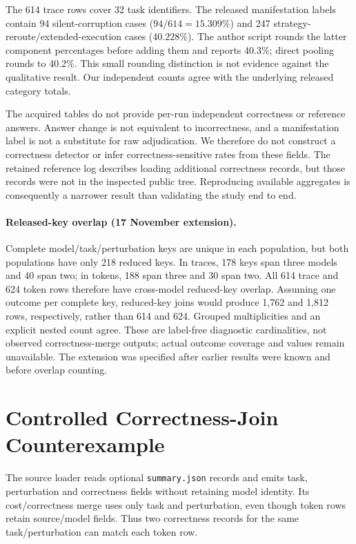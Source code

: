 \documentclass[sigconf,nonacm]{acmart}
\begin{document}
The 614 trace rows cover 32 task identifiers. The released manifestation labels contain 94 silent-corruption cases ($94/614=15.309\%$) and 247 strategy-reroute/extended-execution cases ($40.228\%$). The author script rounds the latter component percentages before adding them and reports 40.3\%; direct pooling rounds to 40.2\%. This small rounding distinction is not evidence against the qualitative result. Our independent counts agree with the underlying released category totals.

The acquired tables do not provide per-run independent correctness or reference answers. Answer change is not equivalent to incorrectness, and a manifestation label is not a substitute for raw adjudication. We therefore do not construct a correctness detector or infer correctness-sensitive rates from these fields. The retained reference log describes loading additional correctness records, but those records were not in the inspected public tree. Reproducing available aggregates is consequently a narrower result than validating the study end to end.

\paragraph{Released-key overlap (17 November extension).}
Complete model/task/perturbation keys are unique in each population, but both populations have only 218 reduced keys. In traces, 178 keys span three models and 40 span two; in tokens, 188 span three and 30 span two. All 614 trace and 624 token rows therefore have cross-model reduced-key overlap. Assuming one outcome per complete key, reduced-key joins would produce 1,762 and 1,812 rows, respectively, rather than 614 and 624. Grouped multiplicities and an explicit nested count agree. These are label-free diagnostic cardinalities, not observed correctness-merge outputs; actual outcome coverage and values remain unavailable. The extension was specified after earlier results were known and before overlap counting.

\section{Controlled Correctness-Join Counterexample}
The source loader reads optional \texttt{summary.json} records and emits task, perturbation and correctness fields without retaining model identity. Its cost/correctness merge uses only task and perturbation, even though token rows retain source/model fields. Thus two correctness records for the same task/perturbation can match each token row.
\end{document}
